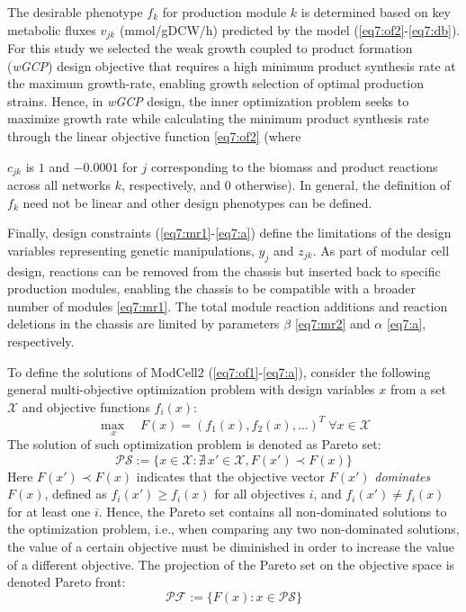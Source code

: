 \documentclass[12pt]{article}
\newcommand\PF{\mathcal{PF}}
\begin{document}
The desirable phenotype $f_k$ for production module $k$ is determined based on key metabolic fluxes $v_{jk}$ (mmol/gDCW/h) predicted by the model (\ref{eq7:of2}-\ref{eq7:db}).
For this study we selected the weak growth coupled to product formation (\emph{wGCP}) design objective that requires a high minimum product synthesis rate at the maximum growth-rate, enabling growth selection of optimal production strains.
Hence, in \emph{wGCP} design, the inner optimization problem seeks to maximize growth rate while calculating the minimum product synthesis rate through the linear objective function \eqref{eq7:of2} (where {$c_{jk}$ is $1$ and $-0.0001$ for $j$ corresponding to the biomass and product reactions across all networks $k$, respectively, and 0 otherwise).
In general, the definition of $f_k$ need not be linear and other design phenotypes can be defined.\citep{garcia2019}

Finally, design constraints (\ref{eq7:mr1}-\ref{eq7:a}) define the limitations of the design variables representing genetic manipulations, $y_j$ and $z_{jk}$.
As part of modular cell design, reactions can be removed from the chassis but inserted back to specific production modules, enabling the chassis to be compatible with a broader number of modules \eqref{eq7:mr1}.
The total module reaction additions and reaction deletions in the chassis are limited by parameters $\beta$ \eqref{eq7:mr2} and $\alpha$ \eqref{eq7:a}, respectively.%

To define the solutions of ModCell2 (\ref{eq7:of1}-\ref{eq7:a}), consider the following general multi-objective optimization problem with design variables $x$ from a set $\mathcal{X}$ and objective functions $f_i(x)$:
\begin{equation*}
    \underset{ \;x}{\max} \quad F(x) = (f_1(x), f_2(x), \ldots)^T \; \forall x \in \mathcal{X}
\end{equation*}
The solution of such optimization problem is denoted as Pareto set:
\begin{equation*}
    \mathcal{PS}:=\{x \in \mathcal{X}:\nexists \, x' \in \mathcal{X}, F(x') \prec F(x)\} \label{eq7:ps}
\end{equation*}
Here $F(x') \prec F(x)$ indicates that the objective vector $F(x')$ \emph{dominates} $F(x)$, defined as $f_i(x') \ge f_i(x)$ for all objectives $i$, and $f_i(x') \ne f_i(x)$ for at least one $i$. Hence, the Pareto set contains all non-dominated solutions to the optimization problem, i.e., when comparing any two non-dominated solutions, the value of a certain objective must be diminished in order to increase the value of a different objective. The projection of the Pareto set on the objective space is denoted Pareto front:
\begin{equation*}
    \PF:=\{F(x): x \in \mathcal{PS} \}
\end{equation*}

}
\end{document}
